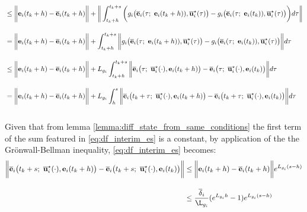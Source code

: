 \begin{gg_box}
\begin{align}
    &\leq \bigg\| \vect{e}_i(t_k +h) - \overline{\vect{e}}_i(t_k + h) \bigg \|
    + \bigg\| \int_{t_k +h}^{t_k + s} \bigg( g_i\big(\overline{\vect{e}}_i(\tau;\ \vect{e}_i(t_k + h)), \overline{\vect{u}}_i^{\star}(\tau)\big)
    -  g_i\big(\overline{\vect{e}}_i(\tau;\ \vect{e}_i(t_k)), \overline{\vect{u}}_i^{\star}(\tau)\big) \bigg) d\tau \bigg\| \\[2.5ex]
    &= \bigg\| \vect{e}_i(t_k +h) - \overline{\vect{e}}_i(t_k + h) \bigg \|
    + \int_{t_k +h}^{t_k + s} \bigg\| g_i\big(\overline{\vect{e}}_i(\tau;\ \vect{e}_i(t_k + h)), \overline{\vect{u}}_i^{\star}(\tau)\big)
    -  g_i\big(\overline{\vect{e}}_i(\tau;\ \vect{e}_i(t_k)), \overline{\vect{u}}_i^{\star}(\tau)\big) \bigg\| d\tau \\[2.5ex]
    &\leq \bigg\| \vect{e}_i(t_k +h) - \overline{\vect{e}}_i(t_k + h) \bigg \|
    + L_{g_i} \int_{t_k +h}^{t_k + s} \bigg\| \overline{\vect{e}}_i\big(\tau;\ \overline{\vect{u}}_i^{\star}(\cdot), \vect{e}_i(t_k + h) \big)
    -  \overline{\vect{e}}_i\big(\tau;\ \overline{\vect{u}}_i^{\star}(\cdot), \vect{e}_i(t_k)\big) \bigg\| d\tau \\[2.5ex]
    &= \bigg\| \vect{e}_i(t_k +h) - \overline{\vect{e}}_i(t_k + h) \bigg \|
    + L_{g_i} \int_{h}^{s} \bigg\| \overline{\vect{e}}_i\big(t_k + \tau;\ \overline{\vect{u}}_i^{\star}(\cdot), \vect{e}_i(t_k + h) \big)
    -  \overline{\vect{e}}_i\big(t_k + \tau;\ \overline{\vect{u}}_i^{\star}(\cdot), \vect{e}_i(t_k)\big) \bigg\| d\tau \\[2.5ex]
    \label{eq:df_interim_es}
\end{align}

Given that from lemma \eqref{lemma:diff_state_from_same_conditions}
the first term of the sum featured in \eqref{eq:df_interim_es} is a constant,
by application of the the Gr\"{o}nwall-Bellman inequality,
\eqref{eq:df_interim_es} becomes:
\begin{align}
  \bigg \| \overline{\vect{e}}_i\big(t_k + s;\ \overline{\vect{u}}_i^{\star}(\cdot), \vect{e}_i(t_k +h)\big)
    -\overline{\vect{e}}_i\big(t_k + s;\ \overline{\vect{u}}_i^{\star}(\cdot), \vect{e}_i(t_k)\big) \bigg \|
    &\leq \bigg\| \vect{e}_i(t_k +h) - \overline{\vect{e}}_i(t_k + h) \bigg \| e^{L_{g_i}(s-h)} \\[2.5ex]
    &\leq \dfrac{\overline{\delta}_i}{\L_{g_i}} (e^{L_{g_i}h} - 1) e^{L_{g_i}(s-h)}
\end{align}
\end{gg_box}

